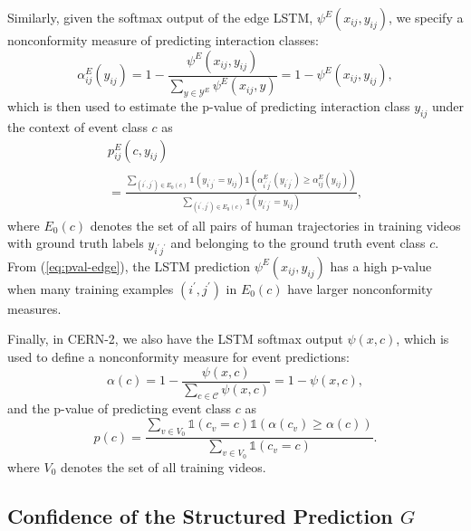 \documentclass[10pt,twocolumn,letterpaper]{article}
\begin{document}
Similarly, given the softmax output of the edge LSTM, $\psi^E(x_{ij},y_{ij})$,  we specify a  nonconformity measure of predicting interaction classes:
\begin{equation}
\alpha^E_{ij}(y_{ij}) = 1 - \frac{\psi^E(x_{ij},y_{ij})}{\sum_{y \in \mathcal{Y}^E} \psi^E(x_{ij},y)}=1-\psi^E(x_{ij},y_{ij}),
\label{eq:alphae}
\end{equation}
which is then used to estimate the p-value of predicting interaction class $y_{ij}$ under the context of event class $c$ as
\begin{equation}
\begin{array}{l}
p^E_{ij}(c,y_{ij})\\
=  \displaystyle \frac{\sum_{(i^\prime, j^\prime) \in E_0(c)} \mathds{1}(y_{i^\prime j^\prime} = y_{ij})\mathds{1}(\alpha^E_{i^\prime j^\prime}(y_{i^\prime j^\prime}) \geq \alpha^E_{ij}(y_{ij}))}{\sum_{(i^\prime, j^\prime) \in E_0(c)}   \mathds{1}(y_{i^\prime j^\prime} = y_{ij})},
\end{array}
\label{eq:pval-edge}
\end{equation}
where $E_0(c)$ denotes the set of all pairs of human trajectories in training videos with ground truth labels $y_{i^\prime j^\prime}$ and belonging to the ground truth event class $c$. From (\ref{eq:pval-edge}), the LSTM prediction $\psi^E(x_{ij},y_{ij})$ has a high p-value when many training examples $(i^\prime, j^\prime)$ in $E_0(c)$ have larger nonconformity measures.

Finally, in CERN-2, we also have the LSTM softmax output $\psi(x,c)$, which is used to define a nonconformity measure for event predictions:
\begin{equation}
\alpha(c) =  1 - \frac{\psi(x,c)}{\sum_{c \in \mathcal{C}} \psi(x,c)}=1-\psi(x,c),
\label{eq:alphan}
\end{equation}
and the p-value of predicting event class $c$ as
\begin{equation}
p(c) =  \frac{\sum_{v \in V_0} \mathds{1}(c_v = c) \mathds{1}(\alpha(c_v) \geq \alpha(c))}{\sum_{v \in V_0} \mathds{1}(c_v = c)}.
\label{eq:pval-event}
\end{equation}
where $V_0$ denotes the set of all training videos.

\subsection{Confidence of the Structured Prediction $G$}
\end{document}
